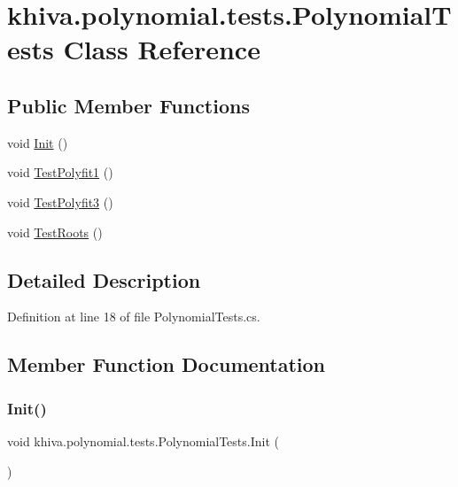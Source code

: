 \hypertarget{classkhiva_1_1polynomial_1_1tests_1_1_polynomial_tests}{}\section{khiva.\+polynomial.\+tests.\+Polynomial\+Tests Class Reference}
\label{classkhiva_1_1polynomial_1_1tests_1_1_polynomial_tests}
\subsection*{Public Member Functions}
\begin{DoxyCompactItemize}
\item 
void \mbox{\hyperlink{classkhiva_1_1polynomial_1_1tests_1_1_polynomial_tests_a9d3cca2aba3e92cbea743e16bf7c1e9c}{Init}} ()
\item 
void \mbox{\hyperlink{classkhiva_1_1polynomial_1_1tests_1_1_polynomial_tests_ae03468abcbce05c5560fe022dfd700bc}{Test\+Polyfit1}} ()
\item 
void \mbox{\hyperlink{classkhiva_1_1polynomial_1_1tests_1_1_polynomial_tests_ac9a921f74df21257045a1f32962cf3a2}{Test\+Polyfit3}} ()
\item 
void \mbox{\hyperlink{classkhiva_1_1polynomial_1_1tests_1_1_polynomial_tests_a86b1c90ecccd4b308247e373afd366aa}{Test\+Roots}} ()
\end{DoxyCompactItemize}


\subsection{Detailed Description}


Definition at line 18 of file Polynomial\+Tests.\+cs.



\subsection{Member Function Documentation}
\mbox{\label{classkhiva_1_1polynomial_1_1tests_1_1_polynomial_tests_a9d3cca2aba3e92cbea743e16bf7c1e9c}} 
\subsubsection{\texorpdfstring{Init()}{Init()}}
{\footnotesize\ttfamily void khiva.\+polynomial.\+tests.\+Polynomial\+Tests.\+Init (\begin{DoxyParamCaption}{ }\end{DoxyParamCaption})\hspace{0.3cm}{\ttfamily [inline]}}



